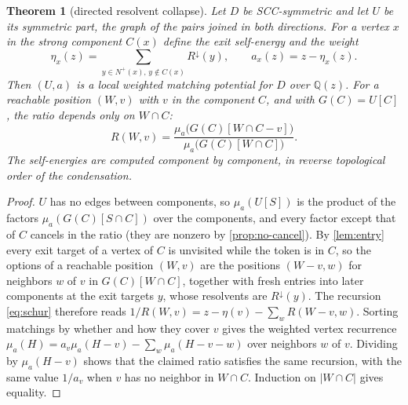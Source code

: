 \documentclass[11pt]{amsart}
\theoremstyle{plain}
\newtheorem{theorem}{Theorem}[section]
\theoremstyle{definition}
\theoremstyle{remark}
\numberwithin{equation}{section}
\newcommand{\QQ}{\mathbb{Q}}
\newcommand{\Qz}{\QQ(z)}
\newcommand{\Rdown}{R^{\downarrow}}
\newcommand{\nplus}{N^{+}}
\begin{document}
\begin{theorem}[directed resolvent collapse]\label{thm:directed-collapse}
Let $D$ be SCC-symmetric and let $U$ be its symmetric part, the graph of the pairs joined in both directions. For a vertex $x$ in the strong component $C(x)$ define the exit self-energy and the weight
\[
\eta_x(z)=\sum_{y\in\nplus(x),\,y\notin C(x)}\Rdown(y),\qquad a_x(z)=z-\eta_x(z).
\]
Then $(U,a)$ is a local weighted matching potential for $D$ over $\Qz$. For a reachable position $(W,v)$ with $v$ in the component $C$, and with $G(C)=U[C]$, the ratio depends only on $W\cap C$:
\[
R(W,v)=\frac{\mu_a\bigl(G(C)[W\cap C-v]\bigr)}{\mu_a\bigl(G(C)[W\cap C]\bigr)}.
\]
The self-energies are computed component by component, in reverse topological order of the condensation.
\end{theorem}

\begin{proof}
$U$ has no edges between components, so $\mu_a(U[S])$ is the product of the factors $\mu_a(G(C)[S\cap C])$ over the components, and every factor except that of $C$ cancels in the ratio (they are nonzero by \cref{prop:no-cancel}). By \cref{lem:entry} every exit target of a vertex of $C$ is unvisited while the token is in $C$, so the options of a reachable position $(W,v)$ are the positions $(W-v,w)$ for neighbors $w$ of $v$ in $G(C)[W\cap C]$, together with fresh entries into later components at the exit targets $y$, whose resolvents are $\Rdown(y)$. The recursion \eqref{eq:schur} therefore reads $1/R(W,v)=z-\eta(v)-\sum_wR(W-v,w)$. Sorting matchings by whether and how they cover $v$ gives the weighted vertex recurrence $\mu_a(H)=a_v\mu_a(H-v)-\sum_w\mu_a(H-v-w)$ over neighbors $w$ of $v$. Dividing by $\mu_a(H-v)$ shows that the claimed ratio satisfies the same recursion, with the same value $1/a_v$ when $v$ has no neighbor in $W\cap C$. Induction on $|W\cap C|$ gives equality.
\end{proof}
\end{document}
